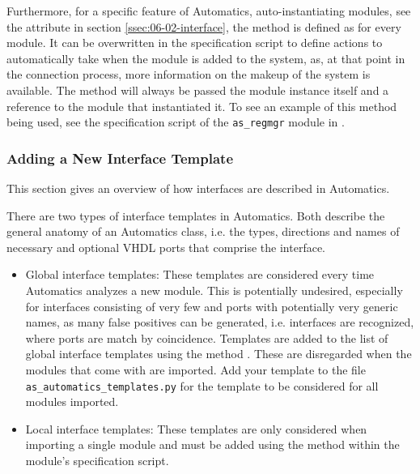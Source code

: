 Furthermore, for a specific feature of Automatics, auto-instantiating modules, see the attribute  in section \ref{ssec:06-02-interface}, the method  is defined as  for every module.
It can be overwritten in the specification script to define actions to automatically take when the module is added to the system, as, at that point in the connection process, more information on the makeup of the system is available.
The method will always be passed the module instance itself and a reference to the module that instantiated it.
To see an example of this method being used, see the specification script of the \texttt{as\_regmgr} module in .


\subsubsection{Adding a New Interface Template}
\label{sec:06-02-new_interface_template}

This section gives an overview of how interfaces are described in Automatics.

There are two types of interface templates in Automatics.
Both describe the general anatomy of an  Automatics class, i.e. the types, directions and names of necessary and optional VHDL ports that comprise the interface.

\begin{itemize}
\item Global interface templates:
These templates are considered every time Automatics analyzes a new module.
This is potentially undesired, especially for interfaces consisting of very few and ports with potentially very generic names, as many false positives can be generated, i.e. interfaces are recognized, where ports are match by coincidence.
Templates are added to the list of global interface templates using the method .
These are disregarded when the modules that come with \asterics are imported.
Add your template to the file \texttt{as\_automatics\_templates.py} for the template to be considered for all modules imported.

\item Local interface templates:
These templates are only considered when importing a single module and must be added using the method  within the module's specification script.
\end{itemize}

